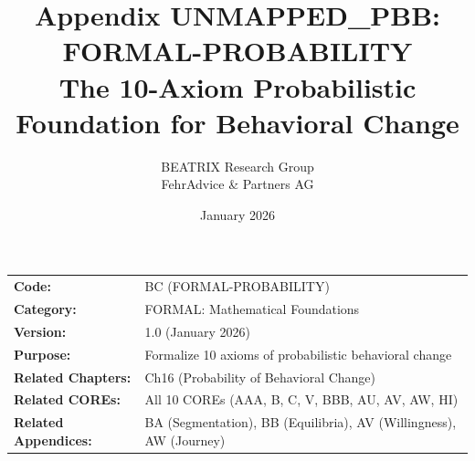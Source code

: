 \documentclass[11pt, a4paper]{article}
\title{Appendix UNMAPPED_PBB: FORMAL-PROBABILITY\\
The 10-Axiom Probabilistic Foundation for Behavioral Change}
\author{BEATRIX Research Group \\ FehrAdvice \& Partners AG}
\date{January 2026}
\begin{document}
\maketitle


\begin{tcolorbox}[colback=gray!10!white, colframe=gray!75!black, title=Appendix Metadata]
\begin{tabular}{@{}ll@{}}
\textbf{Code:} & BC (FORMAL-PROBABILITY) \\
\textbf{Category:} & FORMAL: Mathematical Foundations \\
\textbf{Version:} & 1.0 (January 2026) \\
\textbf{Purpose:} & Formalize 10 axioms of probabilistic behavioral change \\
\textbf{Related Chapters:} & Ch16 (Probability of Behavioral Change) \\
\textbf{Related COREs:} & All 10 COREs (AAA, B, C, V, BBB, AU, AV, AW, HI) \\
\textbf{Related Appendices:} & BA (Segmentation), BB (Equilibria), AV (Willingness), AW (Journey) \\
\end{tabular}
\end{tcolorbox}

\end{document}
